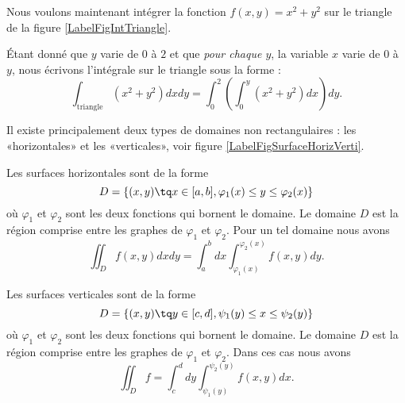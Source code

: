 Nous voulons maintenant intégrer la fonction $f(x,y)=x^2+y^2$ sur le triangle de la figure \ref{LabelFigIntTriangle}.
\newcommand{\CaptionFigIntTriangle}{Intégration sur un triangle.}


Étant donné que $y$ varie de $0$ à $2$ et que \emph{pour chaque $y$}, la variable $x$ varie de $0$ à $y$, nous écrivons l'intégrale sur le triangle sous la forme :
\begin{equation}
	\int_{\text{triangle}}(x^2+y^2)dx dy=\int_0^2\left( \int_0^y(x^2+y^2)dx \right)dy.
\end{equation}

Il existe principalement deux types de domaines non rectangulaires : les «horizontales» et les «verticales», voir figure \ref{LabelFigSurfaceHorizVerti}.

\newcommand{\CaptionFigSurfaceHorizVerti}{Deux types de surfaces. Nous avons tracé un rectangle qui contient chacune des deux surfaces. L'intégrale sur un domaine sera l'intégrale sur le rectangle de la fonction qui vaut zéro en dehors du domaine.}


Les surfaces horizontales sont de la forme 
\begin{equation}
    D=\{ (x,y)\tq x\in\mathopen[ a , b \mathclose],\varphi_1(x)\leq y\leq \varphi_2(x) \}
\end{equation}
où $\varphi_1$ et $\varphi_2$ sont les deux fonctions qui bornent le domaine. Le domaine $D$ est la région comprise entre les graphes de $\varphi_1$ et $\varphi_2$. Pour un tel domaine nous avons
\begin{equation}
    \iint_Df(x,y)dxdy=\int_a^bdx\int_{\varphi_1(x)}^{\varphi_2(x)}f(x,y)dy.
\end{equation}

Les surfaces verticales sont de la forme 
\begin{equation}
    D=\{ (x,y)\tq y\in\mathopen[ c , d \mathclose],\psi_1(y)\leq x\leq \psi_2(y) \}
\end{equation}
où $\varphi_1$ et $\varphi_2$ sont les deux fonctions qui bornent le domaine. Le domaine $D$ est la région comprise entre les graphes de $\varphi_1$ et $\varphi_2$. Dans ces cas nous avons
\begin{equation}
    \iint_Df=\int_c^d dy\int_{\psi_1(y)}^{\psi_2(y)} f(x,y)dx.
\end{equation}

